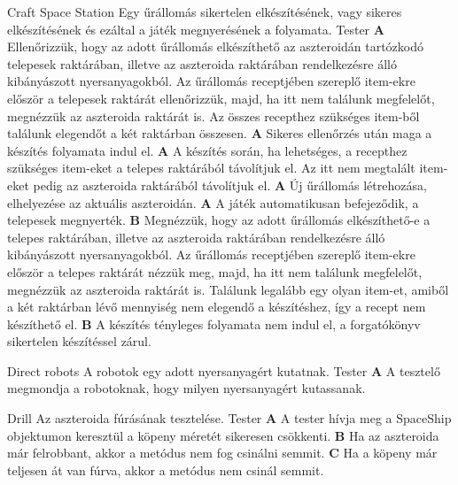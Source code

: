 \documentclass[../../projlab]{subfiles}
\begin{document}
\begin{use-case}
    {Craft Space Station}
    {Egy űrállomás sikertelen elkészítésének, vagy sikeres elkészítésének és ezáltal a játék megnyerésének a folyamata. }
    {Tester} 
    \textbf{A} Ellenőrizzük, hogy az adott űrállomás elkészíthető az aszteroidán tartózkodó telepesek raktárában, illetve az aszteroida raktárában rendelkezésre álló kibányászott nyersanyagokból. Az űrállomás receptjében szereplő item-ekre először a telepesek raktárát ellenőrizzük, majd, ha itt nem találunk megfelelőt, megnézzük az aszteroida raktárát is.  Az összes recepthez szükséges item-ből találunk elegendőt a két raktárban összesen.  \newline
    \textbf{A} Sikeres ellenőrzés után maga a készítés folyamata indul el.  \newline
    \textbf{A} A készítés során, ha lehetséges, a recepthez szükséges item-eket a telepes raktárából távolítjuk el. Az itt nem megtalált item-eket pedig az aszteroida raktárából távolítjuk el.  \newline
    \textbf{A} Új űrállomás létrehozása, elhelyezése az aktuális aszteroidán.  \newline
    \textbf{A} A játék automatikusan befejeződik, a telepesek megnyerték.  \newline
    \textbf{B} Megnézzük, hogy az adott űrállomás elkészíthető-e a telepes raktárában, illetve az aszteroida raktárában rendelkezésre álló kibányászott nyersanyagokból. Az űrállomás receptjében szereplő item-ekre először a telepes raktárát nézzük meg, majd, ha itt nem találunk megfelelőt, megnézzük az aszteroida raktárát is. Találunk legalább egy olyan item-et, amiből a két raktárban lévő mennyiség nem elegendő a készítéshez, így a recept nem készíthető el.  \newline
    \textbf{B} A készítés tényleges folyamata nem indul el, a forgatókönyv sikertelen készítéssel zárul. \newline
\end{use-case}

\begin{use-case}
    {Direct robots}
    {A robotok egy adott nyersanyagért kutatnak. }
    {Tester} 
    \textbf{A} A tesztelő megmondja a robotoknak, hogy milyen nyersanyagért kutassanak.  \newline
\end{use-case}

\begin{use-case}
    {Drill}
    {Az aszteroida fúrásának tesztelése.}
    {Tester} 
    \textbf{A} A tester hívja meg a SpaceShip objektumon keresztül a köpeny méretét sikeresen csökkenti.  \newline
    \textbf{B} Ha az aszteroida már felrobbant, akkor a metódus nem fog csinálni semmit. 
    \textbf{C} Ha a köpeny már teljesen át van fúrva, akkor a metódus nem csinál semmit. \newline
\end{use-case}
\end{document}
